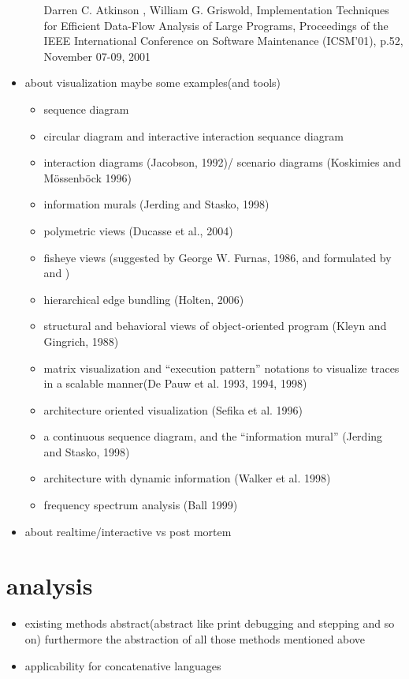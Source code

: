 \begin{itemize}
\begin{itemize}
		Darren C. Atkinson , William G. Griswold, Implementation Techniques for Efficient Data-Flow Analysis of Large Programs, Proceedings of the IEEE International Conference on Software Maintenance (ICSM'01), p.52, November 07-09, 2001
	\end{itemize}
\item about visualization maybe some examples(and tools)
	\begin{itemize}
	\item sequence diagram
	\item circular diagram and interactive interaction sequance diagram \cite{Cornelissen2009}
	\item interaction diagrams (Jacobson, 1992)/ scenario diagrams (Koskimies and Mössenböck 1996)
	\item information murals (Jerding and Stasko, 1998)
	\item polymetric views (Ducasse et al., 2004)
	\item fisheye views (suggested by George W. Furnas, 1986, and formulated by \cite{Storey:1995:GLA:647547.728600} and \cite{Sarkar:1994:GFV:198366.198384})
	\item hierarchical edge bundling (Holten, 2006)
	\item structural and behavioral views of object-oriented program (Kleyn and Gingrich, 1988)
	\item matrix visualization and “execution pattern” notations \cite{Pauw98executionpatterns} to visualize traces in a scalable manner(De Pauw et al. 1993, 1994, 1998) 
	\item architecture oriented visualization (Sefika et al. 1996)
	\item a continuous sequence diagram, and the “information mural” (Jerding and Stasko, 1998)
	\item architecture with dynamic information (Walker et al. 1998)
	\item frequency spectrum analysis (Ball 1999)
	\end{itemize}
\item about realtime/interactive vs post mortem
\end{itemize}

\section{analysis}

\begin{itemize}
\item existing methods abstract(abstract like print debugging and stepping and so on) furthermore the abstraction of all those methods mentioned above
\item applicability for concatenative languages
\end{itemize}

